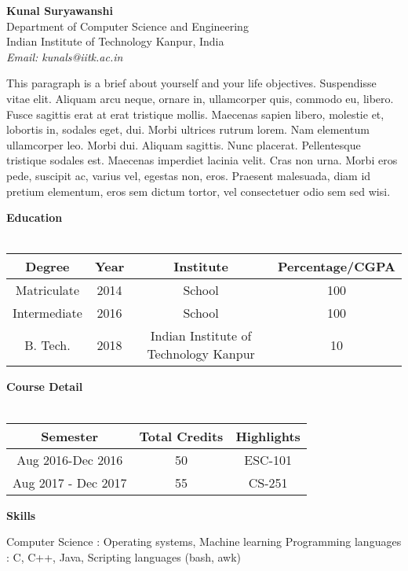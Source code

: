 \documentclass[a4paper, 10pt]{article}
\date{}
\begin{document}
\begin{flushleft}
\textbf{Kunal Suryawanshi}\\
Department of Computer Science and Engineering\\
Indian Institute of Technology Kanpur, India\\
\textit{Email: kunals@iitk.ac.in}
\end{flushleft}
\hline
\hline \vspace{4mm}
This paragraph is a brief about yourself and your life objectives. Suspendisse vitae elit. Aliquam arcu neque, ornare
in, ullamcorper quis, commodo eu, libero. Fusce sagittis erat at erat tristique mollis. Maecenas sapien libero, molestie
et, lobortis in, sodales eget, dui. Morbi ultrices rutrum lorem. Nam elementum ullamcorper leo. Morbi dui. Aliquam
sagittis. Nunc placerat. Pellentesque tristique sodales est. Maecenas imperdiet lacinia velit. Cras non urna. Morbi
eros pede, suscipit ac, varius vel, egestas non, eros. Praesent malesuada, diam id pretium elementum, eros sem
dictum tortor, vel consectetuer odio sem sed wisi.\newline
\hline \hline \vspace{4mm}

\textbf{Education}\\\\\vspace{4mm}
\begin{tabular}{|c|c|c|c|}
\hline
Degree & Year & Institute & Percentage/CGPA\\
\hline
Matriculate & 2014 & School & 100 \\
\hline
Intermediate & 2016 &  School & 100 \\
\hline
B. Tech. & 2018 & Indian Institute of Technology Kanpur & 10 \\
\hline
\end{tabular}

\textbf{Course Detail}\\\\\vspace{4mm}
\begin{tabular}{|c|c|c|}
\hline
Semester & Total Credits  & Highlights \\
\hline
Aug 2016-Dec 2016 & 50 & ESC-101 \\
\hline
Aug 2017 - Dec 2017 & 55 &  CS-251 \\
\hline
\end{tabular}

\textbf{Skills}
\begin{flushleft}
Computer Science \hspace{10mm}: Operating systems, Machine learning\newline
Programming languages \hspace{1mm}: C, C++, Java, Scripting languages (bash, awk)\\
\end{flushleft}
\end{document}
